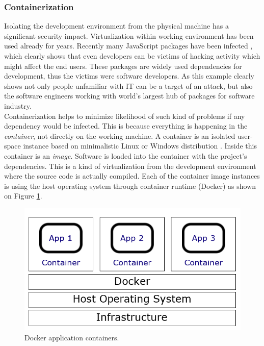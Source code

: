 \documentclass{article} %
\begin{document}
\subsubsection{Containerization}
Isolating the development environment from the physical machine has a significant security impact. Virtualization within working environment has been used already for years. Recently many JavaScript packages have been infected \cite{bib:npm_incident, bib:stealing_envvar, bib:eslint, bib:getcookies}, which clearly shows that even developers can be victims of hacking activity which might affect the end users. These packages are widely used dependencies for development, thus the victims were software developers. As this example clearly shows not only people unfamiliar with IT can be a target of an attack, but also the software engineers working with world's largest hub of packages for software industry.\\
\newline
Containerization helps to minimize likelihood of such kind of problems if any dependency would be infected. This is because everything is happening in the \textit{container}, not directly on the working machine. A container is an isolated user-space instance based on minimalistic Linux or Windows distribution \cite{bib:docker_container}. Inside this container is an \textit{image}. Software is loaded into the container with the project's dependencies. This is a kind of virtualization from the development environment where the source code is actually compiled. Each of the container image instances is using the host operating system through container runtime (Docker) as shown on Figure \ref{fig:containers}.
\begin{figure}[ht]
  \centering
      \includegraphics[width=1\textwidth]{containerization.png}
  \caption{Docker application containers.}
  \label{fig:containers}
\end{figure}\\
\end{document}
